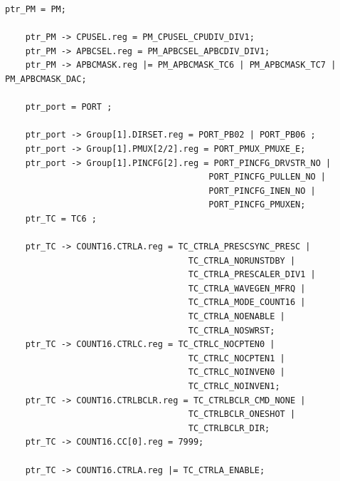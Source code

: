 \documentclass[a4paper]{article}
\begin{document}
\begin{lstlisting}[style=CStyle]
	ptr_PM = PM;
	
	ptr_PM -> CPUSEL.reg = PM_CPUSEL_CPUDIV_DIV1;
	ptr_PM -> APBCSEL.reg = PM_APBCSEL_APBCDIV_DIV1;
	ptr_PM -> APBCMASK.reg |= PM_APBCMASK_TC6 | PM_APBCMASK_TC7 | PM_APBCMASK_DAC;
	
	ptr_port = PORT ;
	
	ptr_port -> Group[1].DIRSET.reg = PORT_PB02 | PORT_PB06 ; 
	ptr_port -> Group[1].PMUX[2/2].reg = PORT_PMUX_PMUXE_E;
	ptr_port -> Group[1].PINCFG[2].reg = PORT_PINCFG_DRVSTR_NO |
										PORT_PINCFG_PULLEN_NO |
										PORT_PINCFG_INEN_NO |
										PORT_PINCFG_PMUXEN;
	ptr_TC = TC6 ;
	
	ptr_TC -> COUNT16.CTRLA.reg = TC_CTRLA_PRESCSYNC_PRESC |
									TC_CTRLA_NORUNSTDBY |
									TC_CTRLA_PRESCALER_DIV1 |
									TC_CTRLA_WAVEGEN_MFRQ |
									TC_CTRLA_MODE_COUNT16 |
									TC_CTRLA_NOENABLE |
									TC_CTRLA_NOSWRST;
	ptr_TC -> COUNT16.CTRLC.reg = TC_CTRLC_NOCPTEN0 |
									TC_CTRLC_NOCPTEN1 |
									TC_CTRLC_NOINVEN0 |
									TC_CTRLC_NOINVEN1;
	ptr_TC -> COUNT16.CTRLBCLR.reg = TC_CTRLBCLR_CMD_NONE |
									TC_CTRLBCLR_ONESHOT |
									TC_CTRLBCLR_DIR;
	ptr_TC -> COUNT16.CC[0].reg = 7999;
	
	ptr_TC -> COUNT16.CTRLA.reg |= TC_CTRLA_ENABLE;	
	\end{lstlisting}
\end{document}
